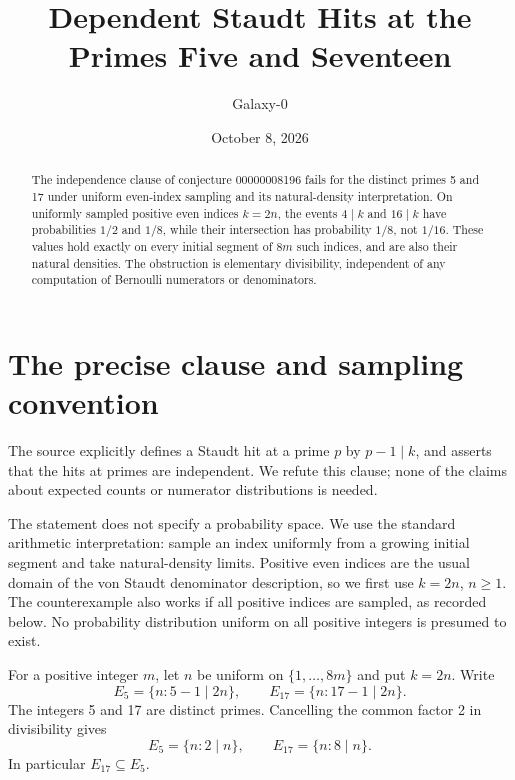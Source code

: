 \documentclass[10pt]{article}
\title{Dependent Staudt Hits at the Primes Five and Seventeen}
\author{Galaxy-0}
\date{October 8, 2026}
\begin{document}
\maketitle
\begin{abstract}
The independence clause of conjecture 00000008196 fails for the distinct primes 5 and 17 under uniform even-index sampling and its natural-density interpretation. On uniformly sampled positive even indices $k=2n$, the events $4\mid k$ and $16\mid k$ have probabilities $1/2$ and $1/8$, while their intersection has probability $1/8$, not $1/16$. These values hold exactly on every initial segment of $8m$ such indices, and are also their natural densities. The obstruction is elementary divisibility, independent of any computation of Bernoulli numerators or denominators.
\end{abstract}
\section{The precise clause and sampling convention}
The source explicitly defines a Staudt hit at a prime $p$ by $p-1\mid k$, and asserts that the hits at primes are independent. We refute this clause; none of the claims about expected counts or numerator distributions is needed.

The statement does not specify a probability space. We use the standard arithmetic interpretation: sample an index uniformly from a growing initial segment and take natural-density limits. Positive even indices are the usual domain of the von Staudt denominator description, so we first use $k=2n$, $n\ge1$. The counterexample also works if all positive indices are sampled, as recorded below. No probability distribution uniform on all positive integers is presumed to exist.

For a positive integer $m$, let $n$ be uniform on $\{1,\ldots,8m\}$ and put $k=2n$. Write
\[
 E_5=\{n:5-1\mid 2n\},\qquad
 E_{17}=\{n:17-1\mid 2n\}.
\]
The integers 5 and 17 are distinct primes. Cancelling the common factor 2 in divisibility gives
\[
 E_5=\{n:2\mid n\},\qquad E_{17}=\{n:8\mid n\}.
\]
In particular $E_{17}\subseteq E_5$.
\end{document}
